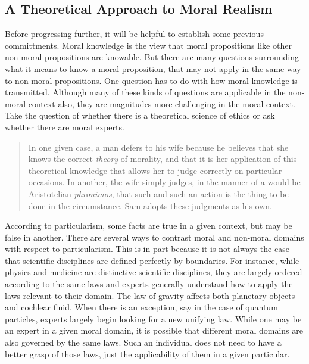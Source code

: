 \documentclass[phdthesis,12pt,final]{wuthesis}
\theoremstyle{definition}
\theoremstyle{definition}
\theoremstyle{definition}
\theoremstyle{definition}
\theoremstyle{remark}
\begin{document}
\subsection*{A Theoretical Approach to Moral Realism}\label{a-theoretical-approach-to-moral-realism}

Before progressing further, it will be helpful to establish some previous committments. Moral knowledge is the view that moral propositions like other non-moral propositions are knowable. But there are many questions surrounding what it means to know a moral proposition, that may not apply in the same way to non-moral propositions. One question has to do with how moral knowledge is transmitted. Although many of these kinds of questions are applicable in the non-moral context also, they are magnitudes more challenging in the moral context. Take the question of whether there is a theoretical science of ethics or ask whether there are moral experts.

\begin{quote}
In one given case, a man defers to his wife because he believes that she knows the correct \emph{theory} of morality, and that it is her application of this theoretical knowledge that allows her to judge correctly on particular occasions. In another, the wife simply judges, in the manner of a would-be Aristotelian \emph{phronimos}, that such-and-such an action is the thing to be done in the circumstance. Sam adopts these judgments as his own.
\end{quote}

According to particularism, some facts are true in a given context, but may be false in another. There are several ways to contrast moral and non-moral domains with respect to particularism. This is in part because it is not always the case that scientific disciplines are defined perfectly by boundaries. For instance, while physics and medicine are distinctive scientific disciplines, they are largely ordered according to the same laws and experts generally understand how to apply the laws relevant to their domain. The law of gravity affects both planetary objects and cochlear fluid. When there is an exception, say in the case of quantum particles, experts largely begin looking for a new unifying law. While one may be an expert in a given moral domain, it is possible that different moral domains are also governed by the same laws. Such an individual does not need to have a better grasp of those laws, just the applicability of them in a given particular.
\end{document}
